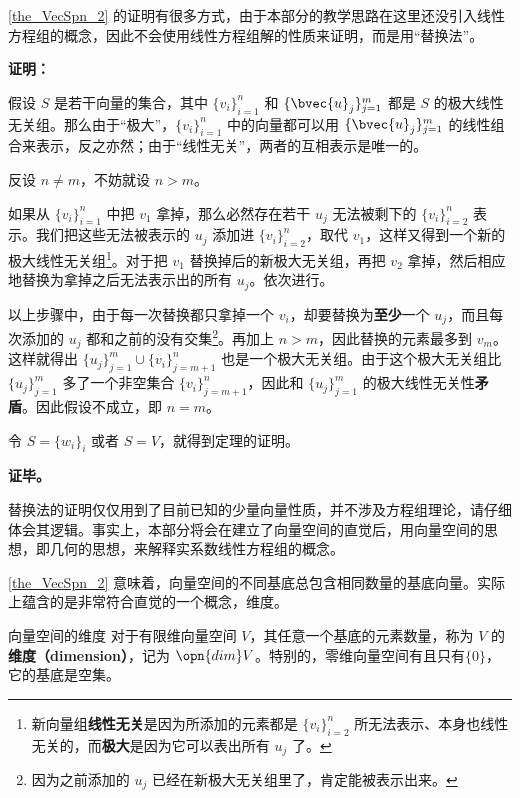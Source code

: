 \autoref{the_VecSpn_2} 的证明有很多方式，由于本部分的教学思路在这里还没引入线性方程组的概念，因此不会使用线性方程组解的性质来证明，而是用“替换法”。


\textbf{证明：}

假设 $S$ 是若干向量的集合，其中 $\{v_i\}_{i=1}^n$ 和 $\{\bvec{u}_j\}^m_{j=1}$ 都是 $S$ 的极大线性无关组。那么由于“极大”，$\{v_i\}_{i=1}^n$ 中的向量都可以用 $\{\bvec{u}_j\}^m_{j=1}$ 的线性组合来表示，反之亦然；由于“线性无关”，两者的互相表示是唯一的。

反设 $n\not=m$，不妨就设 $n>m$。

如果从 $\{v_i\}_{i=1}^n$ 中把 $v_1$ 拿掉，那么必然存在若干 $u_j$ 无法被剩下的 $\{v_i\}_{i=2}^n$ 表示。我们把这些无法被表示的 $u_j$ 添加进 $\{v_i\}_{i=2}^n$，取代 $v_1$，这样又得到一个新的极大线性无关组\footnote{新向量组\textbf{线性无关}是因为所添加的元素都是 $\{v_i\}_{i=2}^n$ 所无法表示、本身也线性无关的，而\textbf{极大}是因为它可以表出所有 $u_j$ 了。}。对于把 $v_1$ 替换掉后的新极大无关组，再把 $v_2$ 拿掉，然后相应地替换为拿掉之后无法表示出的所有 $u_j$。依次进行。

以上步骤中，由于每一次替换都只拿掉一个 $v_i$，却要替换为\textbf{至少}一个 $u_j$，而且每次添加的 $u_j$ 都和之前的没有交集\footnote{因为之前添加的 $u_j$ 已经在新极大无关组里了，肯定能被表示出来。}。再加上 $n>m$，因此替换的元素最多到 $v_m$。这样就得出 $\{u_j\}^m_{j=1} \cup \{v_i\}^n_{j=m+1}$ 也是一个极大无关组。由于这个极大无关组比 $\{u_j\}^m_{j=1}$ 多了一个非空集合 $\{v_i\}^n_{j=m+1}$，因此和 $\{u_j\}^m_{j=1}$ 的极大线性无关性\textbf{矛盾}。因此假设不成立，即 $n=m$。

令 $S=\{w_i\}_i$ 或者 $S=V$，就得到定理的证明。

\textbf{证毕。}

替换法的证明仅仅用到了目前已知的少量向量性质，并不涉及方程组理论，请仔细体会其逻辑。事实上，本部分将会在建立了向量空间的直觉后，用向量空间的思想，即几何的思想，来解释实系数线性方程组的概念。

\autoref{the_VecSpn_2} 意味着，向量空间的不同基底总包含相同数量的基底向量。实际上蕴含的是非常符合直觉的一个概念，维度。

\begin{definition}{向量空间的维度}
对于有限维向量空间 $V$，其任意一个基底的元素数量，称为 $V$ 的\textbf{维度（dimension）}，记为 $\opn{dim} V$。特别的，零维向量空间有且只有$\{0\}$，它的基底是空集。
\end{definition}


